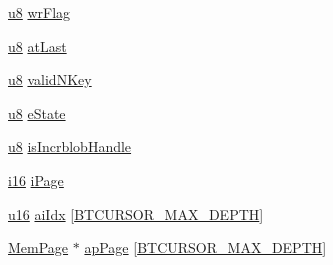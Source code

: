 \begin{DoxyCompactItemize}
\hyperlink{sqlite3_8c_a74a0f6424ae628af25f23f0a35f6ead3}{u8} \hyperlink{struct_bt_cursor_a9482c52d8c85519a3ada18517bf67a47}{wr\-Flag}
\item 
\hyperlink{sqlite3_8c_a74a0f6424ae628af25f23f0a35f6ead3}{u8} \hyperlink{struct_bt_cursor_afff41eb594a5fc2c20b13232e6ff9689}{at\-Last}
\item 
\hyperlink{sqlite3_8c_a74a0f6424ae628af25f23f0a35f6ead3}{u8} \hyperlink{struct_bt_cursor_a7b64ef18751d3076484903e9e9e05098}{valid\-N\-Key}
\item 
\hyperlink{sqlite3_8c_a74a0f6424ae628af25f23f0a35f6ead3}{u8} \hyperlink{struct_bt_cursor_a30ab5e7109965b34a08562a7b7e6de15}{e\-State}
\item 
\hyperlink{sqlite3_8c_a74a0f6424ae628af25f23f0a35f6ead3}{u8} \hyperlink{struct_bt_cursor_a539dc1beff0ec303cfd4c94c274c7a9b}{is\-Incrblob\-Handle}
\item 
\hyperlink{sqlite3_8c_a7b32340f65cd15f029caad258fb3355c}{i16} \hyperlink{struct_bt_cursor_ad4362a71baf655b0957a02324586853b}{i\-Page}
\item 
\hyperlink{sqlite3_8c_a20f2299e322dcbde37cb07b16910b843}{u16} \hyperlink{struct_bt_cursor_a037a739198de5bee22ca203d34e90af1}{ai\-Idx} \mbox{[}\hyperlink{sqlite3_8c_af0a8a704218e75e8258f2e33c3505473}{B\-T\-C\-U\-R\-S\-O\-R\-\_\-\-M\-A\-X\-\_\-\-D\-E\-P\-T\-H}\mbox{]}
\item 
\hyperlink{struct_mem_page}{Mem\-Page} $\ast$ \hyperlink{struct_bt_cursor_ad3414d944f9578e86e26c6158f92096b}{ap\-Page} \mbox{[}\hyperlink{sqlite3_8c_af0a8a704218e75e8258f2e33c3505473}{B\-T\-C\-U\-R\-S\-O\-R\-\_\-\-M\-A\-X\-\_\-\-D\-E\-P\-T\-H}\mbox{]}
\end{DoxyCompactItemize}


